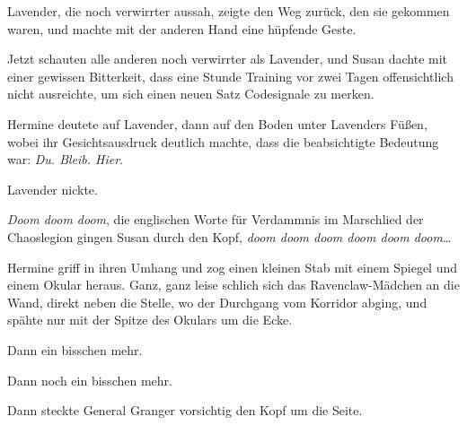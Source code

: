 Lavender, die noch verwirrter aussah, zeigte den Weg zurück, den sie gekommen waren, und machte mit der anderen Hand eine hüpfende Geste.

Jetzt schauten alle anderen noch verwirrter als Lavender, und Susan dachte mit einer gewissen Bitterkeit, dass eine Stunde Training vor zwei Tagen offensichtlich nicht ausreichte, um sich einen neuen Satz Codesignale zu merken.

Hermine deutete auf Lavender, dann auf den Boden unter Lavenders Füßen, wobei ihr Gesichtsausdruck deutlich machte, dass die beabsichtigte Bedeutung war: \emph{Du. Bleib. Hier}.

Lavender nickte.

\emph{Doom doom doom}, die englischen Worte für Verdammnis im Marschlied der Chaoslegion gingen Susan durch den Kopf, \emph{doom doom doom doom doom doom}…

Hermine griff in ihren Umhang und zog einen kleinen Stab mit einem Spiegel und einem Okular heraus. Ganz, ganz leise schlich sich das Ravenclaw-Mädchen an die Wand, direkt neben die Stelle, wo der Durchgang vom Korridor abging, und spähte nur mit der Spitze des Okulars um die Ecke.

Dann ein bisschen mehr.

Dann noch ein bisschen mehr.

Dann steckte General Granger vorsichtig den Kopf um die Seite.

